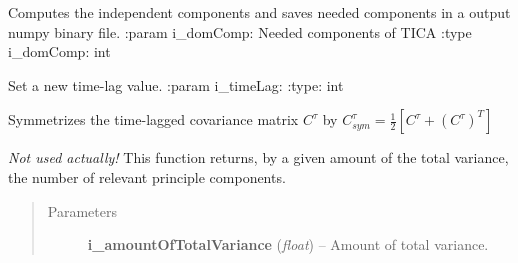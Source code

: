 \documentclass[letterpaper,10pt,english]{sphinxmanual}
\begin{document}
\begin{fulllineitems}
\begin{fulllineitems}
\begin{fulllineitems}
\begin{quote}
\begin{description}
\end{description}\end{quote}

\end{fulllineitems}


\begin{fulllineitems}
\label{tica:Tica_PrincipleComp.TicaPrinComp.TicaPrinCompTimeLagged.performTransformation}
Computes the independent components and saves needed components in a output numpy binary file.
:param i\_domComp: Needed components of TICA
:type i\_domComp: int

\end{fulllineitems}


\begin{fulllineitems}
\label{tica:Tica_PrincipleComp.TicaPrinComp.TicaPrinCompTimeLagged.setTimeLag}
Set a new time-lag value.
:param i\_timeLag:
:type: int

\end{fulllineitems}


\begin{fulllineitems}
\label{tica:Tica_PrincipleComp.TicaPrinComp.TicaPrinCompTimeLagged.symmetrizeCovariance}
Symmetrizes the time-lagged covariance matrix \(C^{\tau}\) by
\(C_{sym}^{\tau} = \frac{1}{2} \left[ C^{\tau} + \left( C^{\tau} \right)^{T} \right]\)

\end{fulllineitems}


\end{fulllineitems}


\begin{fulllineitems}
\label{tica:Tica_PrincipleComp.TicaPrinComp.calcNumbOfDomComps}
\emph{Not used actually!}
This function returns, by a given amount of the total variance, the number of relevant
principle components.
\begin{quote}\begin{description}
\item[{Parameters}] \leavevmode
\textbf{i\_amountOfTotalVariance} (\emph{float}) -- Amount of total variance.


\end{description}
\end{quote}
\end{fulllineitems}
\end{fulllineitems}
\end{document}
